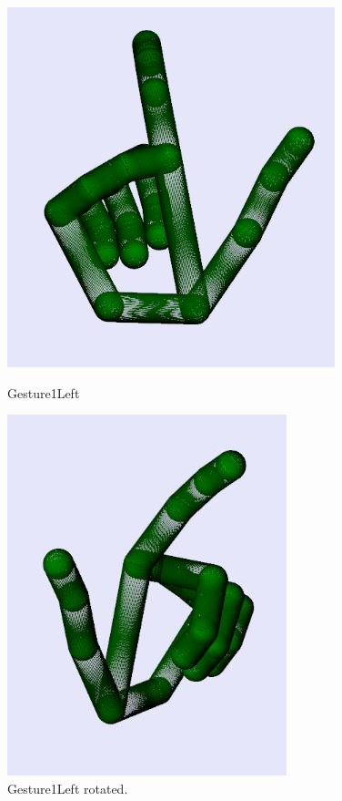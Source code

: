 \begin{figure}[H]
    \centering
    \begin{minipage}{0.5\textwidth}
        \centering
        \includegraphics[scale=.75]{Figures/gesture1Left.JPG} 
        \caption[Gesture1Left]{Gesture1Left}
		\label{fig:Gesture1Left}
    \end{minipage}\hfill
    \begin{minipage}{0.5\textwidth}
        \centering
        \includegraphics[scale=.7]{Figures/gesture1Left_rotated.JPG}
        \caption[Gesture1Left Rotated]{Gesture1Left rotated.}
        \label{fig:Gesture1Left_rotated}
    \end{minipage}
\end{figure}


